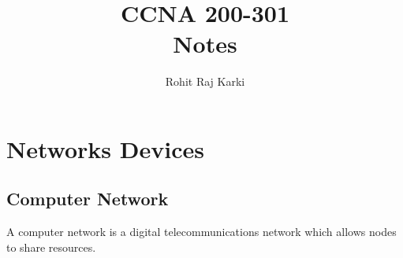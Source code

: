 \documentclass{report}
\title{\Huge{CCNA 200-301}\\ Notes}
\author{\huge{Rohit Raj Karki}}
\date{}
\begin{document}
	\maketitle
	\newpage%
	\tableofcontents
	\pagebreak

	\chapter{Networks Devices}
	\section{Computer Network}
	A computer network is a digital telecommunications network which allows nodes
	to share resources.
\end{document}
